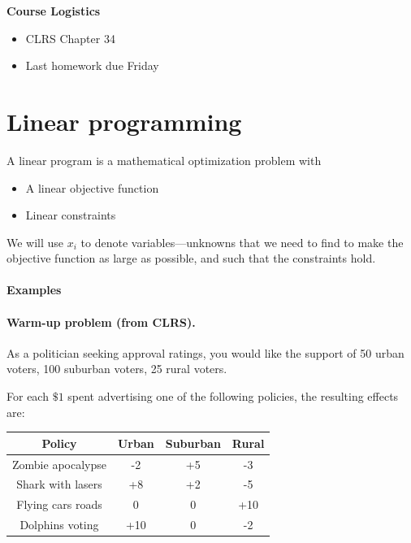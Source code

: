 \documentclass[11  pt]{article}
\begin{document}
	
	\textbf{Course Logistics}
	\begin{itemize}
		\item CLRS Chapter 34
		\item Last homework due Friday
	\end{itemize}
	
	
		\section{Linear programming}
		
		A linear program is a mathematical optimization problem with 
	\begin{itemize}
		\item A linear objective function
		\item Linear constraints
	\end{itemize}

We will use $x_i$ to denote variables---unknowns that we need to find to make the objective function as large as possible, and such that the constraints hold. \\

\paragraph{Examples} 

\newpage

		
		\paragraph{Warm-up problem (from CLRS).} 
As a politician seeking approval ratings, you would like the
support of 50 urban voters, 100 suburban voters, 25 rural
voters. 
		
For each $\$1$ spent advertising one of the following policies,
the resulting effects are:
		
\begin{center}
\begin{tabular}{|c|c|c|c|}
\hline
\textbf{Policy} & \textbf{Urban} & \textbf{Suburban} & \textbf{Rural} \\
\hline
Zombie apocalypse & -2 & +5 & -3 \\
Shark with lasers & +8 & +2 & -5 \\
Flying cars roads & 0 & 0 & +10 \\
Dolphins voting & +10 & 0 & -2 \\
\hline
\end{tabular}
\end{center}		
\end{document}
